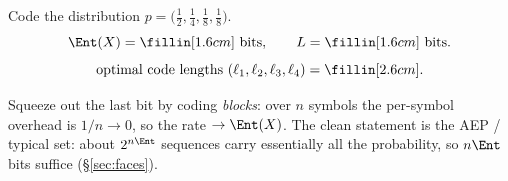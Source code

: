 \begin{yourturn}
Code the distribution $p=\big(\tfrac12,\tfrac14,\tfrac18,\tfrac18\big)$.
\[
  \Ent(X)=\fillin[1.6cm]\text{ bits},\qquad L=\fillin[1.6cm]\text{ bits}.
\]
\[
  \text{optimal code lengths}\ (\ell_1,\ell_2,\ell_3,\ell_4)=\fillin[2.6cm].
\]
\end{yourturn}

\begin{strand}
Squeeze out the last bit by coding \emph{blocks}: over $n$ symbols the per-symbol overhead is
$1/n\to0$, so the rate $\to\Ent(X)$. The clean statement is the AEP / typical set: about
$2^{n\Ent}$ sequences carry essentially all the probability, so $n\Ent$ bits suffice (§\ref{sec:faces}).
\end{strand}
